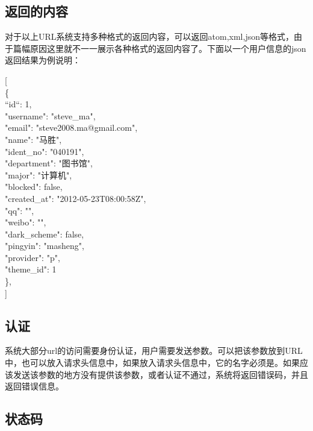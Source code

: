\subsection{返回的内容}
\label{sec:content}

对于以上URL系统支持多种格式的返回内容，可以返回atom,xml,json等格式，由于篇幅原因这里就不一一展示各种格式的返回内容了。下面以一个用户信息的json返回结果为例说明：
\begin{bframe}

[\\
    \{\\
        ``id``: 1,\\
        "username": "steve\_ma",\\
        "email": "steve2008.ma@gmail.com",\\
        "name": "马胜",\\
        "ident\_no": "040191",\\
        "department": "图书馆",\\
        "major": "计算机",\\
        "blocked": false,\\
        "created\_at": "2012-05-23T08:00:58Z",\\
        "qq": "",\\
        "weibo": "",\\
        "dark\_scheme": false,\\
        "pingyin": "masheng",\\
        "provider": "p",\\
        "theme\_id": 1\\
       \},\\
]\\
\end{bframe}

\subsection{认证}
\label{sec:anth}

系统大部分url的访问需要身份认证，用户需要发送参数。可以把该参数放到URL中，也可以放入请求头信息中，如果放入请求头信息中，它的名字必须是。如果应该发送该参数的地方没有提供该参数，或者认证不通过，系统将返回错误码，并且返回错误信息。

\subsection{状态码}
\label{sec:statuscodes}

